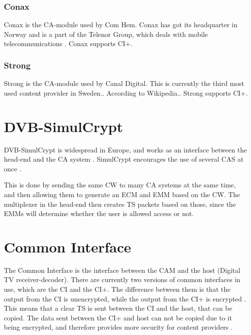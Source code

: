 \subsubsection{Conax}
Conax is the CA-module used by Com Hem. Conax has got its headquarter in Norway 
and is a part of the Telenor Group, which deals with mobile telecommunications 
\citep{Conax}. Conax supports CI+.

\subsubsection{Strong}
Strong is the CA-module used by Canal Digital. This is currently the third most 
used content provider in Sweden..  
According to Wikipedia.. Strong supports CI+.

\section{DVB-SimulCrypt} \label{sec:Simul}
DVB-SimulCrypt is widespread in Europe, and works as an interface between the 
head-end and the CA system \citep{SimulCrypt:2008}. SimulCrypt encourages the 
use of several CAS at once \citep[p. 17]{SimulCrypt:2008}.

This is done by sending the same CW to many CA systems at the same time, and 
then allowing them to generate an ECM and EMM based on the CW. The multiplexer 
in the head-end then creates TS packets based on those, since the EMMs will 
determine whether the user is allowed access or not. 


\section{Common Interface} \label{sec:CI}
The Common Interface is the interface between the CAM and the host (Digital TV 
receiver-decoder). There are currently two versions of common interfaces in use, 
which are the CI and the CI+. The difference between them is that the output 
from the CI is unencrypted, while the output from the CI+ is encrypted 
\citep{CI+:2011}. This means that a clear TS is sent between the CI and the 
host, that can be copied. The data sent between the CI+ and host can not be 
copied due to it being encrypted, and therefore provides more security for 
content providers \citep{CI:1997}.

